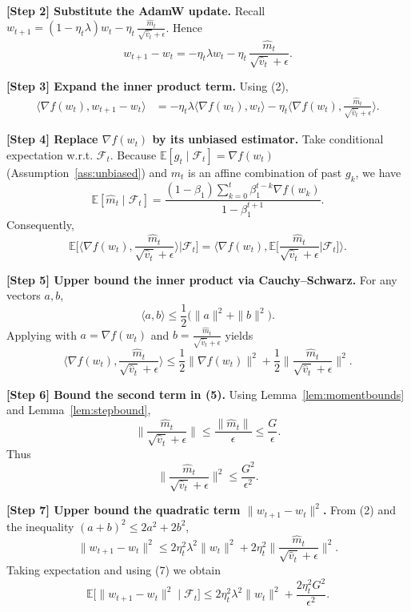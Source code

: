 \documentclass{article}
\begin{document}
\bigskip
\noindent\textbf{[Step 2] Substitute the AdamW update.}
Recall $w_{t+1}= (1-\eta_t\lambda) w_t -\eta_t\,\frac{\hat m_t}{\sqrt{\hat v_t}+\epsilon}$.
Hence
\[
w_{t+1}-w_t = -\eta_t\lambda w_t -\eta_t\,\frac{\hat m_t}{\sqrt{\hat v_t}+\epsilon}.
\tag{2}
\]

\bigskip
\noindent\textbf{[Step 3] Expand the inner product term.}
Using (2),
\[
\begin{aligned}
\langle\nabla f(w_t),w_{t+1}-w_t\rangle
&= -\eta_t\lambda\langle\nabla f(w_t),w_t\rangle
-\eta_t\Big\langle\nabla f(w_t),\frac{\hat m_t}{\sqrt{\hat v_t}+\epsilon}\Big\rangle .
\end{aligned}
\tag{3}
\]

\bigskip
\noindent\textbf{[Step 4] Replace $\nabla f(w_t)$ by its unbiased estimator.}
Take conditional expectation w.r.t. $\mathcal{F}_t$.
Because $\mathbb{E}[g_t\mid\mathcal{F}_t]=\nabla f(w_t)$ (Assumption~\ref{ass:unbiased}) and $m_t$ is an affine combination of past $g_k$, we have
\[
\mathbb{E}[\hat m_t\mid\mathcal{F}_t]=\frac{(1-\beta_1)\sum_{k=0}^{t}\beta_1^{t-k} \nabla f(w_k)}{1-\beta_1^{t+1}} .
\]
Consequently,
\[
\mathbb{E}\Big[\Big\langle\nabla f(w_t),\frac{\hat m_t}{\sqrt{\hat v_t}+\epsilon}\Big\rangle\Big|\mathcal{F}_t\Big]
= \Big\langle\nabla f(w_t),\mathbb{E}\Big[\frac{\hat m_t}{\sqrt{\hat v_t}+\epsilon}\Big|\mathcal{F}_t\Big]\Big\rangle .
\tag{4}
\]

\bigskip
\noindent\textbf{[Step 5] Upper bound the inner product via Cauchy–Schwarz.}
For any vectors $a,b$,
\[
\langle a,b\rangle\le \frac{1}{2}\big(\|a\|^2+\|b\|^2\big).
\]
Applying with $a=\nabla f(w_t)$ and $b=\frac{\hat m_t}{\sqrt{\hat v_t}+\epsilon}$ yields
\[
\Big\langle\nabla f(w_t),\frac{\hat m_t}{\sqrt{\hat v_t}+\epsilon}\Big\rangle
\le \frac{1}{2}\|\nabla f(w_t)\|^2
+\frac{1}{2}\Big\|\frac{\hat m_t}{\sqrt{\hat v_t}+\epsilon}\Big\|^2 .
\tag{5}
\]

\bigskip
\noindent\textbf{[Step 6] Bound the second term in (5).}
Using Lemma~\ref{lem:momentbounds} and Lemma~\ref{lem:stepbound},
\[
\Big\|\frac{\hat m_t}{\sqrt{\hat v_t}+\epsilon}\Big\|
\le \frac{\|\hat m_t\|}{\epsilon}
\le \frac{G}{\epsilon}.
\tag{6}
\]
Thus
\[
\Big\|\frac{\hat m_t}{\sqrt{\hat v_t}+\epsilon}\Big\|^2\le \frac{G^2}{\epsilon^2}.
\tag{7}
\]

\bigskip
\noindent\textbf{[Step 7] Upper bound the quadratic term $\|w_{t+1}-w_t\|^2$.}
From (2) and the inequality $(a+b)^2\le 2a^2+2b^2$,
\[
\|w_{t+1}-w_t\|^2
\le 2\eta_t^2\lambda^2\|w_t\|^2
+2\eta_t^2\Big\|\frac{\hat m_t}{\sqrt{\hat v_t}+\epsilon}\Big\|^2 .
\tag{8}
\]
Taking expectation and using (7) we obtain
\[
\mathbb{E}\big[\|w_{t+1}-w_t\|^2\mid\mathcal{F}_t\big]
\le 2\eta_t^2\lambda^2\|w_t\|^2
+\frac{2\eta_t^2 G^2}{\epsilon^2}.
\tag{9}
\]
\end{document}
